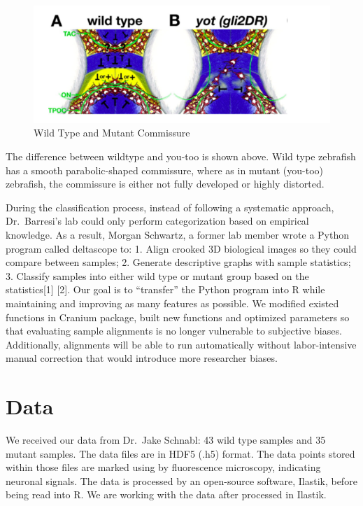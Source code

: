 \documentclass[10pt,letterpaper]{article}
\begin{document}
\begin{figure}[H]
\includegraphics[width=0.9\linewidth]{visualization_paper/wt_yt} \caption{Wild Type and Mutant Commissure}\label{fig:Figure1}
\end{figure}

The difference between wildtype and you-too is shown above. Wild type
zebrafish has a smooth parabolic-shaped commissure, where as in mutant
(you-too) zebrafish, the commissure is either not fully developed or
highly distorted.

During the classification process, instead of following a systematic
approach, Dr.~Barresi's lab could only perform categorization based on
empirical knowledge. As a result, Morgan Schwartz, a former lab member
wrote a Python program called deltascope to: 1. Align crooked 3D
biological images so they could compare between samples; 2. Generate
descriptive graphs with sample statistics; 3. Classify samples into
either wild type or mutant group based on the statistics{[}1{]} {[}2{]}.
Our goal is to ``transfer'' the Python program into R while maintaining
and improving as many features as possible. We modified existed
functions in Cranium package, built new functions and optimized
parameters so that evaluating sample alignments is no longer vulnerable
to subjective biases. Additionally, alignments will be able to run
automatically without labor-intensive manual correction that would
introduce more researcher biases.

\section{Data}\label{data}

We received our data from Dr.~Jake Schnabl: 43 wild type samples and 35
mutant samples. The data files are in HDF5 (.h5) format. The data points
stored within those files are marked using by fluorescence microscopy,
indicating neuronal signals. The data is processed by an open-source
software, Ilastik, before being read into R. We are working with the
data after processed in Ilastik.
\end{document}
